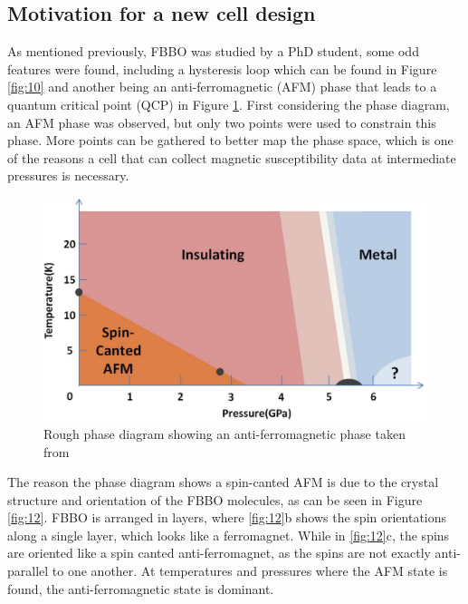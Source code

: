 \documentclass[11pt,onecolumn]{article}
\begin{document}
\subsection{Motivation for a new cell design}
\label{sec:motivation}

As mentioned previously, FBBO was studied by a PhD student, some odd features were found, including a hysteresis loop which can be found in Figure \ref{fig:10} and another being an anti-ferromagnetic (AFM) phase that leads to a quantum critical point (QCP) in Figure \ref{fig:11}. First considering the phase diagram, an AFM phase was observed, but only two points were used to constrain this phase. More points can be gathered to better map the phase space, which is one of the reasons a cell that can collect magnetic susceptibility data at intermediate pressures is necessary.

\begin{figure}[ht]
	\centering
	\includegraphics[width=.7\columnwidth]{figures/phase_diagram.png}
	\caption{Rough phase diagram showing an anti-ferromagnetic phase taken from \cite{Di_thesis}}
	\label{fig:11}
\end{figure}

The reason the phase diagram shows a spin-canted AFM is due to the crystal structure and orientation of the FBBO molecules, as can be seen in Figure \ref{fig:12}. FBBO is arranged in layers, where \ref{fig:12}b shows the spin orientations along a single layer, which looks like a ferromagnet. While in \ref{fig:12}c, the spins are oriented like a spin canted anti-ferromagnet, as the spins are not exactly anti-parallel to one another. At temperatures and pressures where the AFM state is found, the anti-ferromagnetic state is dominant.\\
\end{document}
